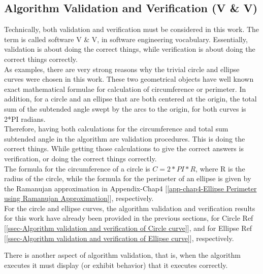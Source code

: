\clearpage
\pagebreak

\subsection{Algorithm Validation and Verification (V \& V)} 

Technically, both validation and verification must be considered in this work. The term is called software V \& V, in software engineering vocabulary.	Essentially, validation is about doing the correct things, while verification is about doing the correct things correctly. \\

As examples, there are very strong reasons why the trivial circle and ellipse curves were chosen in this work. These two geometrical objects have well known exact mathematical formulae for calculation of circumference or perimeter. In addition, for a circle and an ellipse that are both centered at the origin, the total sum of the subtended angle swept by the arcs to the origin, for both curves is 2*PI radians. \\

Therefore, having both calculations for the circumference and total sum subtended angle in the algorithm are validation procedures. This is doing the correct things. While getting those calculations to give the correct answers is verification, or doing the correct things correctly.\\ 

The formula for the circumference of a circle is $C = 2*PI*R$, where R is the radius of the circle, while the formula for the perimeter of an ellipse is given by the Ramanujan approximation in Appendix-Chap4 [\ref{app-chap4-Ellipse Perimeter using Ramanujan Approximation}],  respectively.\\      

For the circle and ellipse curves, the algorithm validation and verification results for this work have already been provided in the previous sections, for Circle Ref [\ref{ssec-Algorithm validation and verification of Circle curve}], and for Ellipse Ref [\ref{ssec-Algorithm validation and verification of Ellipse curve}], respectively.\\

\clearpage
\pagebreak

There is another aspect of algorithm validation, that is, when the algorithm executes it must display (or exhibit behavior) that it executes correctly.\\

